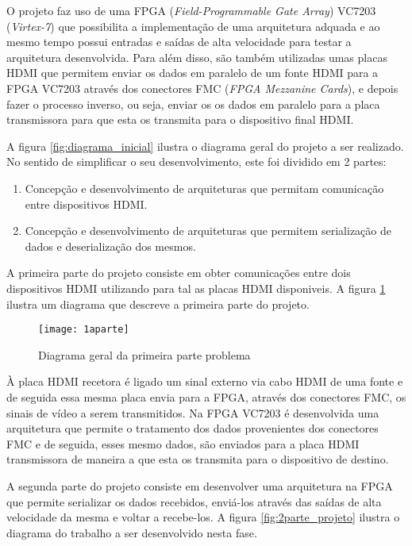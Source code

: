O projeto faz uso de uma FPGA (\textit{Field-Programmable Gate Array}) VC7203 (\textit{Virtex-7}) que possibilita a implementação de uma arquitetura adquada e ao mesmo tempo possui entradas e saídas de alta velocidade para testar a arquitetura desenvolvida. Para além disso, são também utilizadas umas placas HDMI que permitem enviar os dados em paralelo de um fonte HDMI para a FPGA VC7203 através dos conectores FMC (\textit{FPGA Mezzanine Cards}), e depois fazer o processo inverso, ou seja, enviar os os dados em paralelo para a placa transmissora para que esta os transmita para o dispositivo final HDMI.

A figura \ref{fig:diagrama_inicial}  ilustra o diagrama geral do projeto a ser realizado. No sentido de simplificar o seu desenvolvimento, este foi dividido em 2 partes:
\begin{enumerate}
	\item Concepção e desenvolvimento de arquiteturas que permitam comunicação entre dispositivos HDMI.
	\item Concepção e desenvolvimento de arquiteturas que permitem serialização de dados e deserialização dos mesmos.
\end{enumerate}

A primeira parte do projeto consiste em obter comunicações entre dois dispositivos HDMI utilizando para tal as placas HDMI disponiveis. A figura \ref{fig:1parte_projeto} ilustra um diagrama que descreve a primeira parte do projeto.
\begin{figure}[h!]
	\begin{center}
		\leavevmode
		\texttt{[image: 1aparte]}
		\caption{Diagrama geral da primeira parte problema}
		\label{fig:1parte_projeto}
	\end{center}
\end{figure}

À placa HDMI recetora é ligado um sinal externo via cabo HDMI de uma fonte e de seguida essa mesma placa envia para a FPGA, através dos conectores FMC, os sinais de vídeo a serem transmitidos. Na FPGA VC7203 é desenvolvida uma arquitetura que permite o tratamento dos dados provenientes dos conectores FMC e de seguida, esses mesmo dados, são enviados para a placa HDMI transmissora de maneira a que esta os transmita para o dispositivo de destino.

A segunda parte do projeto consiste em desenvolver uma arquitetura na FPGA que permite serializar os dados recebidos, enviá-los através das saídas de alta velocidade da mesma e voltar a recebe-los. A figura \ref{fig:2parte_projeto} ilustra o diagrama do trabalho a ser desenvolvido nesta fase.

